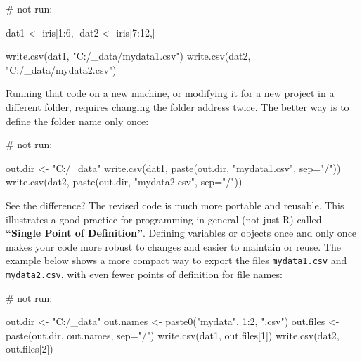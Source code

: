 \documentclass[
  13,
  letterpaper,
]{report}
\newenvironment{Shaded}{\begin{snugshade}}{\end{snugshade}}
\newcommand{\AttributeTok}[1]{\textcolor[rgb]{0.40,0.45,0.13}{#1}}
\newcommand{\CommentTok}[1]{\textcolor[rgb]{0.37,0.37,0.37}{#1}}
\newcommand{\DecValTok}[1]{\textcolor[rgb]{0.68,0.00,0.00}{#1}}
\newcommand{\FunctionTok}[1]{\textcolor[rgb]{0.28,0.35,0.67}{#1}}
\newcommand{\NormalTok}[1]{\textcolor[rgb]{0.00,0.23,0.31}{#1}}
\newcommand{\OtherTok}[1]{\textcolor[rgb]{0.00,0.23,0.31}{#1}}
\newcommand{\SpecialCharTok}[1]{\textcolor[rgb]{0.37,0.37,0.37}{#1}}
\newcommand{\StringTok}[1]{\textcolor[rgb]{0.13,0.47,0.30}{#1}}
\begin{document}
\begin{Shaded}
\begin{Highlighting}[]
\CommentTok{\# not run:}

\NormalTok{dat1 }\OtherTok{\textless{}{-}}\NormalTok{ iris[}\DecValTok{1}\SpecialCharTok{:}\DecValTok{6}\NormalTok{,]}
\NormalTok{dat2 }\OtherTok{\textless{}{-}}\NormalTok{ iris[}\DecValTok{7}\SpecialCharTok{:}\DecValTok{12}\NormalTok{,]}

\FunctionTok{write.csv}\NormalTok{(dat1, }\StringTok{"C:/\_data/mydata1.csv"}\NormalTok{)}
\FunctionTok{write.csv}\NormalTok{(dat2, }\StringTok{"C:/\_data/mydata2.csv"}\NormalTok{)}
\end{Highlighting}
\end{Shaded}

Running that code on a new machine, or modifying it for a new project in
a different folder, requires changing the folder address twice. The
better way is to define the folder name only once:

\begin{Shaded}
\begin{Highlighting}[]
\CommentTok{\# not run:}

\NormalTok{out.dir }\OtherTok{\textless{}{-}} \StringTok{"C:/\_data"}
\FunctionTok{write.csv}\NormalTok{(dat1, }\FunctionTok{paste}\NormalTok{(out.dir, }\StringTok{"mydata1.csv"}\NormalTok{, }\AttributeTok{sep=}\StringTok{"/"}\NormalTok{))}
\FunctionTok{write.csv}\NormalTok{(dat2, }\FunctionTok{paste}\NormalTok{(out.dir, }\StringTok{"mydata2.csv"}\NormalTok{, }\AttributeTok{sep=}\StringTok{"/"}\NormalTok{))}
\end{Highlighting}
\end{Shaded}

See the difference? The revised code is much more portable and reusable.
This illustrates a good practice for programming in general (not just R)
called \textbf{``Single Point of Definition''}. Defining variables or
objects once and only once makes your code more robust to changes and
easier to maintain or reuse. The example below shows a more compact way
to export the files \texttt{mydata1.csv} and \texttt{mydata2.csv}, with
even fewer points of definition for file names:

\begin{Shaded}
\begin{Highlighting}[]
\CommentTok{\# not run:}

\NormalTok{out.dir }\OtherTok{\textless{}{-}} \StringTok{"C:/\_data"}
\NormalTok{out.names }\OtherTok{\textless{}{-}} \FunctionTok{paste0}\NormalTok{(}\StringTok{"mydata"}\NormalTok{, }\DecValTok{1}\SpecialCharTok{:}\DecValTok{2}\NormalTok{, }\StringTok{".csv"}\NormalTok{)}
\NormalTok{out.files }\OtherTok{\textless{}{-}} \FunctionTok{paste}\NormalTok{(out.dir, out.names, }\AttributeTok{sep=}\StringTok{"/"}\NormalTok{)}
\FunctionTok{write.csv}\NormalTok{(dat1, out.files[}\DecValTok{1}\NormalTok{])}
\FunctionTok{write.csv}\NormalTok{(dat2, out.files[}\DecValTok{2}\NormalTok{])}
\end{Highlighting}
\end{Shaded}
\end{document}
